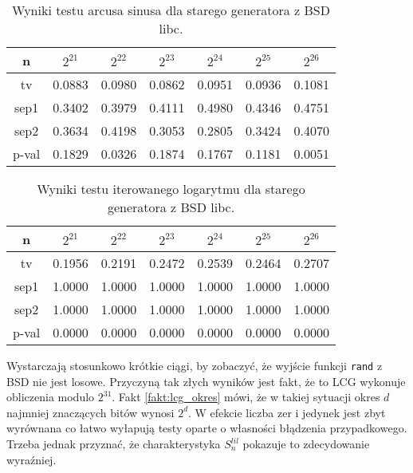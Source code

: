 \documentclass[a4paper,11pt,twoside]{book}
\newcommand{\Slil}[1]{S^{lil}_#1}
\theoremstyle{definition}
\begin{document}
\begin{table}[ht!]
\centering
 \caption{Wyniki testu arcusa sinusa dla starego generatora z BSD libc.}
 \label{tab:bsd_asin}
\begin{tabular} {||c|c|c|c|c|c|c||}  
 \hline 
      n &  $2^{21}$ &  $2^{22}$ &  $2^{23}$ &  $2^{24}$ &  $2^{25}$ &  $2^{26}$\\ \hline
     tv &  0.0883 &  0.0980 &  0.0862 &  0.0951 &  0.0936 &  0.1081\\ \hline
   sep1 &  0.3402 &  0.3979 &  0.4111 &  0.4980 &  0.4346 &  0.4751\\ \hline
   sep2 &  0.3634 &  0.4198 &  0.3053 &  0.2805 &  0.3424 &  0.4070\\ \hline
  p-val &  0.1829 &  0.0326 &  0.1874 &  0.1767 &  0.1181 &  0.0051\\ \hline

\end{tabular}  
\end{table}
\begin{table}[ht!]
\centering
 \caption{Wyniki testu iterowanego logarytmu dla starego generatora z BSD libc.}
 \label{tab:bsd_lil}
\begin{tabular} {||c|c|c|c|c|c|c||}  
 \hline 
      n &  $2^{21}$ &  $2^{22}$ &  $2^{23}$ &  $2^{24}$ &  $2^{25}$ &  $2^{26}$\\ \hline
     tv &  0.1956 &  0.2191 &  0.2472 &  0.2539 &  0.2464 &  0.2707\\ \hline
   sep1 &  1.0000 &  1.0000 &  1.0000 &  1.0000 &  1.0000 &  1.0000\\ \hline
   sep2 &  1.0000 &  1.0000 &  1.0000 &  1.0000 &  1.0000 &  1.0000\\ \hline
  p-val &  0.0000 &  0.0000 &  0.0000 &  0.0000 &  0.0000 &  0.0000\\ \hline
\end{tabular}  
\end{table}

Wystarczają stosunkowo krótkie ciągi, by zobaczyć, że wyjście funkcji \texttt{rand} z BSD nie jest losowe. Przyczyną tak złych wyników jest fakt, że to LCG wykonuje obliczenia modulo $2^{31}$. Fakt \ref{fakt:lcg_okres} mówi, że w takiej sytuacji okres $d$ najmniej znaczących bitów wynosi $2^d$. W efekcie liczba zer i jedynek jest zbyt wyrównana co łatwo wyłapują testy oparte o własności błądzenia przypadkowego. Trzeba jednak przyznać, że charakterystyka $\Slil{n}$ pokazuje to zdecydowanie wyraźniej.

\FloatBarrier
\end{document}
